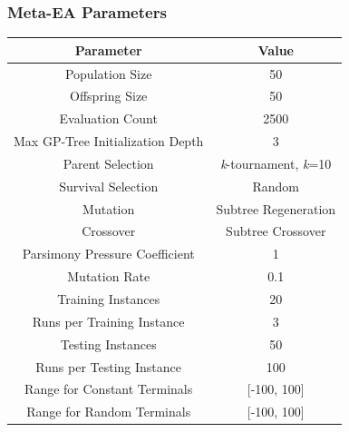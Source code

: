 \documentclass{beamer}
\begin{document}
	\begin{frame}
		\frametitle{Meta-EA Parameters}
		\begin{table}
			\small
			\begin{tabular}{ c | c | }
			    Parameter& Value\\
			    \hline \hline
			    Population Size & 50 \\
			    \hline
			    Offspring Size & 50\\
			    \hline
			    Evaluation Count & 2500\\
			    \hline
			    Max GP-Tree Initialization Depth & 3\\
			    \hline
			    Parent Selection & \textit{k}-tournament, \textit{k}=10 \\
			    \hline
			    Survival Selection & Random\\
			    \hline
			    Mutation & Subtree Regeneration\\
			    \hline
			    Crossover & Subtree Crossover\\
			    \hline
			    Parsimony Pressure Coefficient & 1\\
			    \hline
			    Mutation Rate & 0.1\\
			    \hline
			    Training Instances & 20 \\
			    \hline
			    Runs per Training Instance & 3 \\
			    \hline
			    Testing Instances & 50 \\
			    \hline
			    Runs per Testing Instance & 100 \\
			    \hline
			    Range for Constant Terminals & [-100, 100]\\
			    \hline
			    Range for Random Terminals & [-100, 100]\\
			\end{tabular}
		\end{table}
	\end{frame}
	
\end{document}
